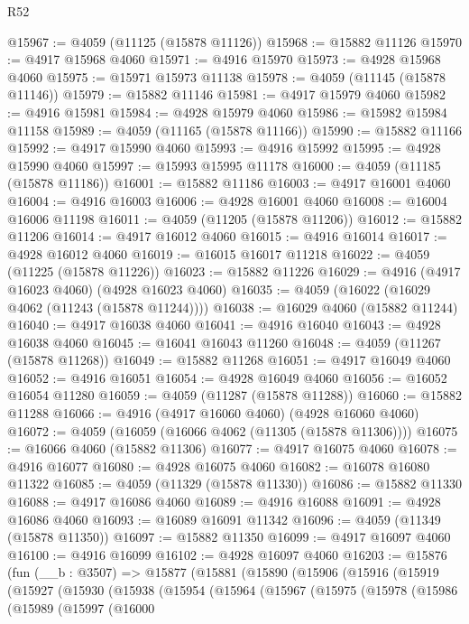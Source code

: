 \begin{lexlean}{R52}
\begin{coremodule}
@15967 := @4059 (@11125 (@15878 @11126))
@15968 := @15882 @11126
@15970 := @4917 @15968 @4060
@15971 := @4916 @15970
@15973 := @4928 @15968 @4060
@15975 := @15971 @15973 @11138
@15978 := @4059 (@11145 (@15878 @11146))
@15979 := @15882 @11146
@15981 := @4917 @15979 @4060
@15982 := @4916 @15981
@15984 := @4928 @15979 @4060
@15986 := @15982 @15984 @11158
@15989 := @4059 (@11165 (@15878 @11166))
@15990 := @15882 @11166
@15992 := @4917 @15990 @4060
@15993 := @4916 @15992
@15995 := @4928 @15990 @4060
@15997 := @15993 @15995 @11178
@16000 := @4059 (@11185 (@15878 @11186))
@16001 := @15882 @11186
@16003 := @4917 @16001 @4060
@16004 := @4916 @16003
@16006 := @4928 @16001 @4060
@16008 := @16004 @16006 @11198
@16011 := @4059 (@11205 (@15878 @11206))
@16012 := @15882 @11206
@16014 := @4917 @16012 @4060
@16015 := @4916 @16014
@16017 := @4928 @16012 @4060
@16019 := @16015 @16017 @11218
@16022 := @4059 (@11225 (@15878 @11226))
@16023 := @15882 @11226
@16029 := @4916 (@4917 @16023 @4060) (@4928 @16023 @4060)
@16035 := @4059 (@16022 (@16029 @4062 (@11243 (@15878 @11244))))
@16038 := @16029 @4060 (@15882 @11244)
@16040 := @4917 @16038 @4060
@16041 := @4916 @16040
@16043 := @4928 @16038 @4060
@16045 := @16041 @16043 @11260
@16048 := @4059 (@11267 (@15878 @11268))
@16049 := @15882 @11268
@16051 := @4917 @16049 @4060
@16052 := @4916 @16051
@16054 := @4928 @16049 @4060
@16056 := @16052 @16054 @11280
@16059 := @4059 (@11287 (@15878 @11288))
@16060 := @15882 @11288
@16066 := @4916 (@4917 @16060 @4060) (@4928 @16060 @4060)
@16072 := @4059 (@16059 (@16066 @4062 (@11305 (@15878 @11306))))
@16075 := @16066 @4060 (@15882 @11306)
@16077 := @4917 @16075 @4060
@16078 := @4916 @16077
@16080 := @4928 @16075 @4060
@16082 := @16078 @16080 @11322
@16085 := @4059 (@11329 (@15878 @11330))
@16086 := @15882 @11330
@16088 := @4917 @16086 @4060
@16089 := @4916 @16088
@16091 := @4928 @16086 @4060
@16093 := @16089 @16091 @11342
@16096 := @4059 (@11349 (@15878 @11350))
@16097 := @15882 @11350
@16099 := @4917 @16097 @4060
@16100 := @4916 @16099
@16102 := @4928 @16097 @4060
@16203 := @15876
    (fun (__b : @3507) =>
    @15877
      (@15881
        (@15890
          (@15906
            (@15916
              (@15919
                (@15927
                  (@15930
                    (@15938
                      (@15954
                        (@15964
                          (@15967
                            (@15975
                              (@15978
                                (@15986
                                  (@15989
                                    (@15997
                                      (@16000

\end{coremodule}
\end{lexlean}
